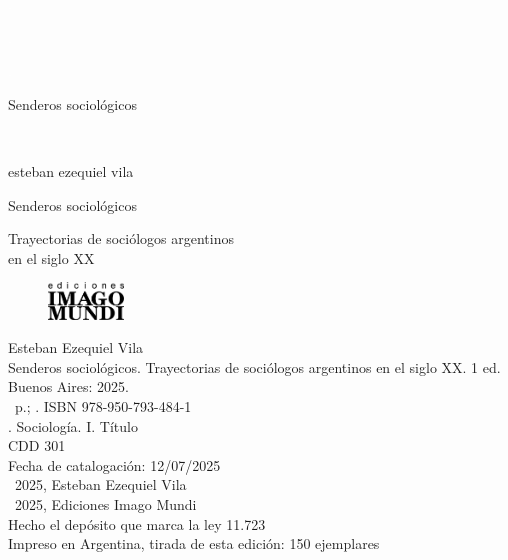 \newpage
\thispagestyle{empty}
{\textcolor{white}{.}}

\newpage
\thispagestyle{empty}
{\textcolor{white}{.}}

\newpage
\thispagestyle{empty}
{\textcolor{white}{.}}

\vspace{30mm}

\begin{center}
	\LARGE{Senderos sociológicos}
\end{center}

\newpage
\thispagestyle{empty}
{\textcolor{white}{.}}

\newpage
\thispagestyle{empty}
\begin{center}%
{\sc\large{esteban ezequiel vila}}\\ %
\end{center}

\vspace{30mm}

\begin{center}
\LARGE{Senderos sociológicos}\\\vspace{10mm}

\Large{Trayectorias de sociólogos argentinos\\ en el siglo XX}
\end{center}

\vfill

\begin{figure}[b]
\centering
\includegraphics[width=20mm]{./media/logo-imago-ByW.png}
\end{figure}

\newpage
\thispagestyle{empty}

\noindent Esteban Ezequiel Vila \\
\noindent Senderos sociológicos. Trayectorias de sociólogos argentinos en el siglo XX. 1 ed. Buenos Aires: 2025.\\
\noindent \ztotpages\ p.; \valorEspecifico. ISBN 978-950-793-484-1 \\
. Sociología. I. Título \\
\noindent CDD 301\\
\noindent Fecha de catalogación: 12/07/2025 \\
\noindent \textcopyright~2025, Esteban Ezequiel Vila \\
\noindent \textcopyright~2025, Ediciones Imago Mundi\\
\noindent Hecho el depósito que marca la ley 11.723\\
\noindent Impreso en Argentina, tirada de esta edición: 150 ejemplares\\

